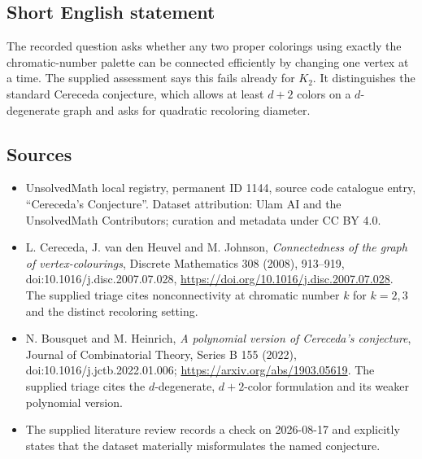 \documentclass[11pt]{article}
\begin{document}
\subsection{Short English statement}
The recorded question asks whether any two proper colorings using exactly the chromatic-number palette can be connected efficiently by changing one vertex at a time. The supplied assessment says this fails already for $K_2$. It distinguishes the standard Cereceda conjecture, which allows at least $d+2$ colors on a $d$-degenerate graph and asks for quadratic recoloring diameter.
\subsection{Sources}
\begin{itemize}
\item UnsolvedMath local registry, permanent ID 1144, source code catalogue entry, ``Cereceda's Conjecture''. Dataset attribution: Ulam AI and the UnsolvedMath Contributors; curation and metadata under CC BY 4.0.
\item L. Cereceda, J. van den Heuvel and M. Johnson, \emph{Connectedness of the graph of vertex-colourings}, Discrete Mathematics 308 (2008), 913--919, doi:10.1016/j.disc.2007.07.028, \url{https://doi.org/10.1016/j.disc.2007.07.028}. The supplied triage cites nonconnectivity at chromatic number $k$ for $k=2,3$ and the distinct recoloring setting.
\item N. Bousquet and M. Heinrich, \emph{A polynomial version of Cereceda's conjecture}, Journal of Combinatorial Theory, Series B 155 (2022), doi:10.1016/j.jctb.2022.01.006; \url{https://arxiv.org/abs/1903.05619}. The supplied triage cites the $d$-degenerate, $d+2$-color formulation and its weaker polynomial version.
\item The supplied literature review records a check on 2026-08-17 and explicitly states that the dataset materially misformulates the named conjecture.
\end{itemize}
\end{document}
